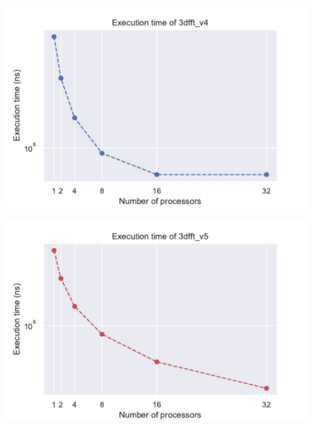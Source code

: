 \begin{figure}[H]
\centering
\begin{minipage}{.5\textwidth}
  \centering
  \includegraphics[width=\linewidth]{./data/execution_v4_log.pdf}
  \label{fig:exec_v4_log}
\end{minipage}%
\begin{minipage}{.5\textwidth}
  \centering
  \includegraphics[width=\linewidth]{./data/execution_v5_log.pdf}
  \label{fig:exec_v5_log}
\end{minipage}
\end{figure}

